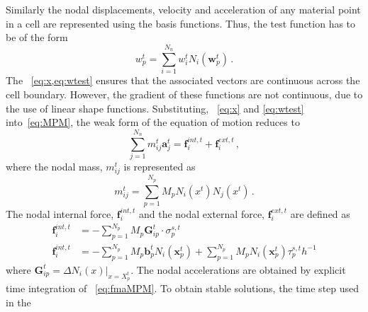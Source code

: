 %
Similarly the nodal displacements, velocity and acceleration of any material 
point in a cell are represented using the basis functions. Thus, the test 
function has to be of the form
%
\begin{equation}
\mathbf{\mathit{w}}_{p}^{t} = \sum\limits_{\mathit{i}=1}^{\mathit{N}_{n}} 
\mathbf{\mathit{w}}_{\mathit{i}}^{t}\mathit{N}_{\mathit{i}}(\mathbf{w}_{p}^{t}) 
\,.
\label{eq:wtest}
\end{equation}
%
The ~\cref{eq:x,eq:wtest} ensures that the associated vectors are 
continuous across the cell boundary. However, the gradient of these functions 
are not continuous, due to the use of linear shape functions. Substituting, 
~\cref{eq:x} and \cref{eq:wtest} into~\cref{eq:MPM}, the weak form of the 
equation of motion reduces to
%
\begin{equation}
\sum\limits_{\mathit{j}=1}^{\mathit{N}_{n}} m_{\mathit{ij}}^{\mathit{t}} 
\mathbf{a}_{\mathit{j}}^{\mathit{t}} = \mathbf{f}_{\mathit{i}}^{int,\mathit{t}} 
+ \mathbf{f}_{\mathit{i}}^{ext,\mathit{t}} \,,
\label{eq:fmaMPM}
\end{equation}
%
where the nodal mass, $m_{\mathit{ij}}^{\mathit{t}}$ is represented as
%
\begin{equation}
m_{\mathit{ij}}^{\mathit{t}} = \sum\limits_{\mathit{p=1}}^{N_{p}} 
\mathit{M}_{p} \mathit{N}_{\mathit{i}} (\mathbf{\mathit{x}}^{\mathit{t}}) 
\mathit{N}_{\mathit{j}} (\mathbf{\mathit{x}}^{\mathit{t}}) \,.
\end{equation}
%
The nodal internal force, $\mathbf{f}_{\mathit{i}}^{int,\mathit{t}}$ and the 
nodal external force, $\mathbf{f}_{\mathit{i}}^{ext,\mathit{t}}$ are defined as
%
\begin{align}
\nonumber
 \mathbf{f}_{\mathit{i}}^{int,\mathit{t}} & = - 
\sum\limits_{\mathit{p}=1}^{\mathit{N}_{p}}\mathit{M}_{p} \mathbf{G}_{ip}^{t} 
\cdot \sigma_{p}^{\mathit{s,t}} \\ 
\mathbf{f}_{\mathit{i}}^{int,\mathit{t}} & = - 
\sum\limits_{\mathit{p}=1}^{\mathit{N}_{p}}\mathit{M}_{p}  
\mathbf{b}_{p}^{\mathit{t}}\mathit{N}_{\mathit{i}}(\mathbf{x}_{p}^{\mathit{t}}) 
+ \sum\limits_{\mathit{p}=1}^{\mathit{N}_{p}}\mathit{M}_{p} 
\mathit{N}_{\mathit{i}}(\mathbf{x}_{p}^{\mathit{t}}) 
\tau_{p}^{\mathit{s,t}}\mathit{h}^{-1}
\end{align}
where $\mathbf{G}_{\mathit{ip}}^{\mathit{t}} = \Delta \mathit{N}_{\mathit{i}} 
(\mathbf{\mathit{x}})|_{\mathbf{\mathit{x}}=\mathbf{\mathit{X}}_{p}^{\mathit{t}}}$.
The nodal accelerations are obtained by explicit time integration of 
~\cref{eq:fmaMPM}. To obtain stable solutions, the time step used in the 
